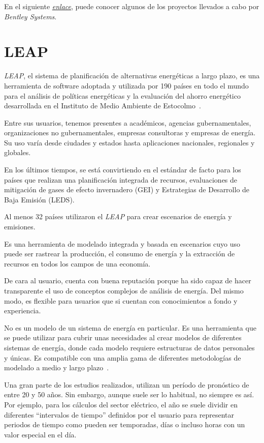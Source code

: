 En el siguiente \href{https://www.bentley.com/es/project-profiles}{\textit{enlace}}, puede conocer algunos de los proyectos llevados a cabo por \textit{Bentley Systems}.

\section{LEAP}

\textit{LEAP}, el sistema de planificación de alternativas energéticas a largo plazo, es una herramienta de software adoptada y utilizada por 190 países en todo el mundo para el análisis de políticas energéticas y la evaluación del ahorro energético desarrollada en el Instituto de Medio Ambiente de Estocolmo~\cite{web:LEAP}.

Entre sus usuarios, tenemos presentes a académicos, agencias gubernamentales, organizaciones no gubernamentales, empresas consultoras y empresas de energía. Su uso varía desde ciudades y estados hasta aplicaciones nacionales, regionales y globales.

En los últimos tiempos, se está convirtiendo en el estándar de facto para los países que realizan una planificación integrada de recursos, evaluaciones de mitigación de gases de efecto invernadero (GEI) y Estrategias de Desarrollo de Baja Emisión (LEDS).

Al menos 32 países utilizaron el \textit{LEAP} para crear escenarios de energía y emisiones.

Es una herramienta de modelado integrada y basada en escenarios cuyo uso puede ser rastrear la producción, el consumo de energía y la extracción de recursos en todos los campos de una economía. 

De cara al usuario, cuenta con buena reputación porque ha sido capaz de hacer transparente el uso de conceptos complejos de análisis de energía. Del mismo modo, es flexible para usuarios que si cuentan con conocimientos a fondo y experiencia.

No es un modelo de un sistema de energía en particular. Es una herramienta que se puede utilizar para cubrir unas necesidades al crear modelos de diferentes sistemas de energía, donde cada modelo requiere estructuras de datos personales y únicas. Es compatible con una amplia gama de diferentes metodologías de modelado a medio y largo plazo~\cite{web:LEAP}.

Una gran parte de los estudios realizados, utilizan un período de pronóstico de entre 20 y 50 años. Sin embargo, aunque suele ser lo habitual, no siempre es así. Por ejemplo, para los cálculos del sector eléctrico, el año se suele dividir en diferentes ``intervalos de tiempo'' definidos por el usuario para representar periodos de tiempo como pueden ser temporadas, días o incluso horas con un valor especial en el día.

